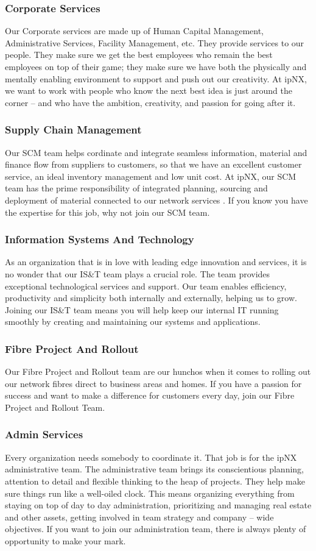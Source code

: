 \subsubsection{Corporate Services}
Our Corporate services are made up of Human Capital Management, Administrative Services, Facility Management, etc. They provide services to our people. They make sure we get the best employees who remain the best employees on top of their game; they make sure we have both the physically and mentally enabling environment to support and push out our creativity. At ipNX, we want to work with people who know the next best idea is just around the corner – and who have the ambition, creativity, and passion for going after it.
\subsubsection{Supply Chain Management}
Our SCM team helps cordinate and integrate  seamless information, material and finance flow from suppliers to customers, so that we have an excellent customer service, an ideal inventory management and low unit cost. At ipNX, our SCM team has the prime responsibility of integrated planning, sourcing and deployment of material connected to our network services . If you know you have the expertise for this job, why not join our SCM team.
\subsubsection{Information Systems And Technology}
As an organization that is in love with leading edge innovation and services, it is no wonder that our IS\&T team plays a crucial role. The team provides exceptional technological services and support. Our team enables efficiency, productivity and simplicity both internally and externally, helping us to grow. Joining our IS\&T team means you will help keep our internal IT running smoothly by creating and maintaining our systems and applications.
\subsubsection{Fibre Project And Rollout}
Our Fibre Project and Rollout team are our hunchos when it comes to rolling out our network fibres direct to business areas and homes. If you have a passion for  success and want to make a difference for customers every day, join our Fibre Project and Rollout Team.
\subsubsection{Admin Services}
Every organization needs somebody to coordinate it. That job is for the ipNX administrative team. The administrative team brings its conscientious planning, attention to detail and flexible thinking to the heap of projects. They help make sure things run like a well-oiled clock. This means organizing everything from staying on top of day to day administration, prioritizing and managing real estate and other assets, getting involved in team strategy and company – wide objectives. If you want to join our administration team, there is always plenty of opportunity to make your mark.
